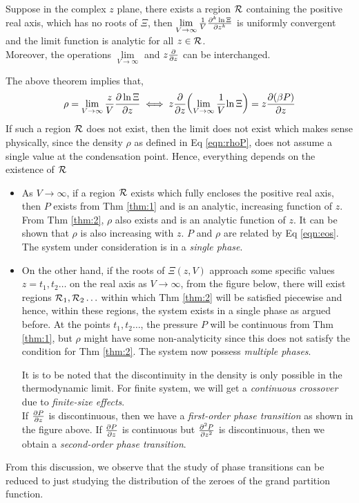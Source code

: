 \begin{theorem}\label{thm:2}
    Suppose in the complex $z$ plane, there exists a region $\mathcal R$ containing the positive real axis, which has no roots of $\Xi$, then $\lim\limits_{V\to \infty}\frac{1}{V}\pdv[k]{\ln \Xi}{z}$ is uniformly convergent and the limit function is analytic for all $z\in \mathcal R$.\\[0.2cm]
    Moreover, the operations $\lim\limits_{V\to \infty}$ and $z\pdv{z}$ can be interchanged. 
\end{theorem}
The above theorem implies that, \begin{equation}\label{eqn:eos}
    \rho = \lim\limits_{V\to\infty} \frac{z}{V}\pdv{\ln\Xi}{z} \iff z\pdv{z}\qty(\lim\limits_{V\to\infty} \frac{1}{V} {\ln\Xi}) = z\pdv{(\beta P)}{z}
\end{equation}
If such a region $\mathcal R$ does not exist, then the limit does not exist which makes sense physically, since the density $\rho $ as defined in Eq \eqref{eqn:rhoP}, does not assume a single value at the condensation point. Hence, everything depends on the existence of $\mathcal R$
\begin{itemize}
    \item As $V\to \infty$, if a region $\mathcal R$ exists  which fully encloses the positive real axis, then $P$ exists from Thm \eqref{thm:1} and is an analytic, increasing function of $z$. From Thm \eqref{thm:2}, $\rho$ also exists and is an analytic function of $z$. It can be shown that $\rho$ is also increasing with $z$. $P$ and $\rho$ are related by Eq \eqref{eqn:eos}. The system under consideration is in a \textit{single phase}.
    \begin{figure}[H]
        \centering
        
    \end{figure}
    \noindent
    \item On the other hand, if the roots of $\Xi(z,V)$ approach some specific values $z=t_1,t_2\ldots$ on the real axis as $V\to\infty$, from the figure below, there will exist regions $\mathcal R_1,\mathcal R_2\ldots$ within which Thm \eqref{thm:2} will be satisfied piecewise and hence, within these regions, the system exists in a single phase as argued before. At the points $t_1, t_2\ldots$, the pressure $P$ will be continuous from Thm \eqref{thm:1}, but $\rho$ might have some non-analyticity since this does not satisfy the condition for Thm \eqref{thm:2}. The system now possess \textit{multiple phases}. 
    \begin{figure}[H]
        \centering
        
    \end{figure}
    \noindent 
    It is to be noted that the discontinuity in the density is only possible in the thermodynamic limit. For finite system, we will get a \textit{continuous crossover} due to \textit{finite-size effects}.\\[0.2cm]
    If $\pdv{P}{z}$ is discontinuous, then we have a \textit{first-order phase transition} as shown in the figure above. If $\pdv{P}{z}$ is continuous but $\pdv[2]{P}{z}$ is discontinuous, then we obtain a \textit{second-order phase transition}.
\end{itemize}  
From this discussion, we observe that the study of phase transitions can be reduced to just studying the distribution of the zeroes of the grand partition function.